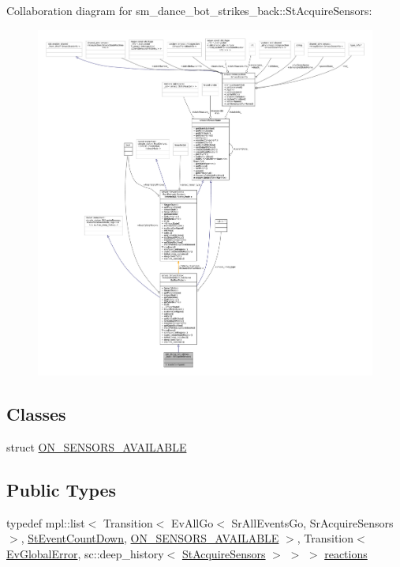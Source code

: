 Collaboration diagram for sm\+\_\+dance\+\_\+bot\+\_\+strikes\+\_\+back\+:\+:St\+Acquire\+Sensors\+:
\nopagebreak
\begin{figure}[H]
\begin{center}
\leavevmode
\includegraphics[width=350pt]{structsm__dance__bot__strikes__back_1_1StAcquireSensors__coll__graph}
\end{center}
\end{figure}
\subsection*{Classes}
\begin{DoxyCompactItemize}
\item 
struct \hyperlink{structsm__dance__bot__strikes__back_1_1StAcquireSensors_1_1ON__SENSORS__AVAILABLE}{O\+N\+\_\+\+S\+E\+N\+S\+O\+R\+S\+\_\+\+A\+V\+A\+I\+L\+A\+B\+LE}
\end{DoxyCompactItemize}
\subsection*{Public Types}
\begin{DoxyCompactItemize}
\item 
typedef mpl\+::list$<$ Transition$<$ Ev\+All\+Go$<$ Sr\+All\+Events\+Go, Sr\+Acquire\+Sensors $>$, \hyperlink{structsm__dance__bot__strikes__back_1_1StEventCountDown}{St\+Event\+Count\+Down}, \hyperlink{structsm__dance__bot__strikes__back_1_1StAcquireSensors_1_1ON__SENSORS__AVAILABLE}{O\+N\+\_\+\+S\+E\+N\+S\+O\+R\+S\+\_\+\+A\+V\+A\+I\+L\+A\+B\+LE} $>$, Transition$<$ \hyperlink{structsm__dance__bot__strikes__back_1_1EvGlobalError}{Ev\+Global\+Error}, sc\+::deep\+\_\+history$<$ \hyperlink{structsm__dance__bot__strikes__back_1_1StAcquireSensors}{St\+Acquire\+Sensors} $>$ $>$ $>$ \hyperlink{structsm__dance__bot__strikes__back_1_1StAcquireSensors_ad65bcd9c9ba0118eff0670ec6eed65fd}{reactions}
\end{DoxyCompactItemize}
